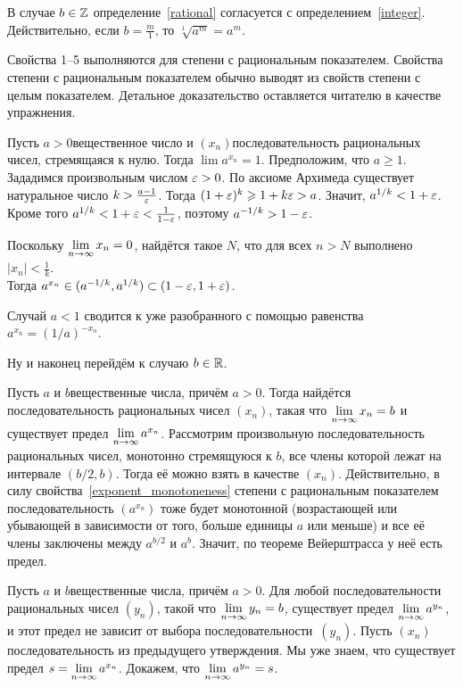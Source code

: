 \documentclass[a4paper,12pt,fleqn]{article}
\begin{document}
В случае $b\in\mathbb{Z}$ определение~\ref{rational} согласуется с определением~\ref{integer}.
Действительно, если $b = \frac{m}{1}$, то $\sqrt[1]{a^m} = a^m$.

\label{rational_properties}
Свойства 1--5 выполняются для степени с рациональным показателем.
Свойства степени с рациональным показателем обычно выводят из свойств степени с целым показателем. Детальное доказательство оставляется читателю в качестве упражнения.

\label{zero_limit}
Пусть $a > 0$\т вещественное число и $(x_n)$\т последовательность рациональных чисел, стремящаяся к нулю. Тогда $\lim a^{x_n} = 1$.
Предположим, что $a \ge 1$. Зададимся произвольным числом $\varepsilon > 0$. По аксиоме Архимеда существует натуральное число $k > \frac{a-1}{\varepsilon}$. Тогда $(1+\varepsilon)^k \geqslant 1 + k\varepsilon > a$. Значит, $a^{1/k} < 1+\varepsilon$. Кроме того $a^{1/k} < 1+\varepsilon < \frac{1}{1-\varepsilon}$, поэтому $a^{-1/k} > 1-\varepsilon$.

Поскольку $\lim\limits_{n \rightarrow \infty} x_n = 0$, найдётся такое $N$, что для всех $n > N$ выполнено $|x_n| < \frac{1}{k}$. \\
Тогда $a^{x_n} \in (a^{-1/k}, a^{1/k}) \subset (1-\varepsilon, 1+\varepsilon)$.

Случай $a < 1$ сводится к уже разобранного с помощью равенства $a^{x_n} = (1/a)^{-x_n}$.

\bigskip
Ну и наконец перейдём к случаю $b\in\mathbb{R}$.

\label{exists}
Пусть $a$ и $b$\т вещественные числа, причём $a > 0$. Тогда найдётся  последовательность рациональных чисел $(x_n)$, такая что $\lim\limits_{n \rightarrow \infty} x_n = b$ и существует предел $\lim\limits_{n \rightarrow \infty} a^{x_n}$.
Рассмотрим произвольную последовательность рациональных чисел,  монотонно стремящуюся к $b$, все члены которой лежат на интервале $(b/2, b)$. Тогда её можно взять в качестве $(x_n)$. Действительно, в силу свойства~\ref{exponent_monotoneness} степени с рациональным показателем последовательность $(a^{x_n})$ тоже будет монотонной (возрастающей или убывающей в зависимости от того, больше единицы $a$ или меньше) и все её члены заключены между $a^{b/2}$ и $a^b$. Значит, по теореме Вейерштрасса у неё есть предел.

\label{only}
Пусть $a$ и $b$\т вещественные числа, причём $a > 0$. Для любой последовательности рациональных чисел $(y_n)$, такой что $\lim\limits_{n \rightarrow \infty} y_n = b$, существует предел $\lim\limits_{n \rightarrow \infty} a^{y_n}$, и этот предел не зависит от выбора последовательности~$(y_n)$.
Пусть $(x_n)$\т последовательность из предыдущего утверждения. Мы уже знаем, что существует предел $s = \lim\limits_{n \rightarrow \infty} a^{x_n}$. Докажем, что $\lim\limits_{n \rightarrow \infty} a^{y_n} = s$. 
\end{document}
